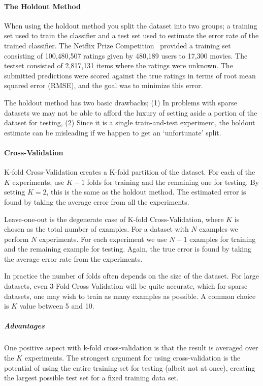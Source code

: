 \paragraph{The Holdout Method}
When using the holdout method you split the dataset into two groups; a training
set used to train the classifier and a test set used to estimate the error rate
of the trained classifier. The Netflix Prize Competition~\cite{Netflix}
provided a training set consisting of 100,480,507 ratings given by 480,189
users to 17,300 movies. The testset consisted of 2,817,131 items where the
ratings were unknown. The submitted predictions were scored against the true
ratings in terms of root mean squared error (RMSE), and the goal was to
minimize this error.

The holdout method has two basic drawbacks; (1) In problems with sparse
datasets we may not be able to afford the luxury of setting aside a portion of
the dataset for testing, (2) Since it is a single train-and-test experiment,
the holdout estimate can be misleading if we happen to get an `unfortunate'
split.

\paragraph{Cross-Validation}
K-fold Cross-Validation creates a K-fold partition of the dataset. For each of
the $K$ experiments, use $K-1$ folds for training and the remaining one for
testing. By setting $K=2$, this is the same as the holdout method. The estimated
error is found by taking the average error from all the experiments.

Leave-one-out is the degenerate case of K-fold Cross-Validation, where $K$ is
chosen as the total number of examples. For a dataset with $N$ examples we
perform $N$ experiments. For each experiment we use $N-1$ examples for training
and the remaining example for testing. Again, the true error is found by taking
the average error rate from the experiments.

In practice the number of folds often depends on the size of the dataset. For
large datasets, even 3-Fold Cross Validation will be quite accurate, which for
sparse datasets, one may wish to train as many examples as possible. A common
choice is $K$ value between 5 and 10.

\subparagraph{Advantages}
One positive aspect with k-fold cross-validation is that the result is averaged over the $K$ experiments. The strongest argument for using cross-validation is the potential of using the entire training set for testing (albeit not at once), creating the largest possible test set for a fixed training data set.

